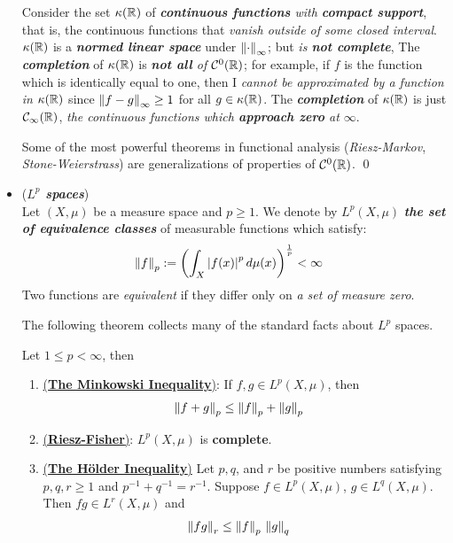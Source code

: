 \documentclass[11pt]{article}
\begin{document}
\begin{itemize}
\begin{example}
Consider the set $\kappa({\mathbb R})$ of \emph{\textbf{continuous functions} with \textbf{compact support}}, that is, the continuous functions that \emph{vanish outside of some closed interval}.  $\kappa({\mathbb R})$  is a \emph{\textbf{normed linear space}} under $\left\|\cdot\right\|_{\infty}$; but \emph{is \textbf{not complete}}, The \emph{\textbf{completion}} of $\kappa({\mathbb R})$ is \emph{\textbf{not all} of ${\mathcal C}^{0}({\mathbb R})$}; for example, if $f$ is the function which is identically equal to one, then I \emph{cannot be approximated by a function in $\kappa({\mathbb R})$} since $\left\|f - g\right\|_{\infty} \ge 1$ for all $g \in \kappa({\mathbb R})$. The \emph{\textbf{completion}} of $\kappa({\mathbb R})$ is just ${\mathcal C}_{\infty}({\mathbb R})$, \emph{the continuous functions which \textbf{approach zero} at $\infty$}. 

Some of the most powerful theorems in functional analysis (\emph{Riesz-Markov}, \emph{Stone-Weierstrass}) are generalizations of properties of ${\mathcal C}^{0}({\mathbb R})$. \qed
\end{example}

\item \begin{example} (\emph{\textbf{$L^{p}$ spaces}})\\
Let $(X, \mu)$ be a measure space and $p\ge 1$. We denote by $L^{p}(X, \mu)$ \emph{\textbf{the set of equivalence classes}} of measurable functions which satisfy:
\begin{align*}
\left\|f\right\|_{p} &:= \left(\int_{X}\left\lvert f(x) \right\rvert^p d\mu(x)\right)^{\frac{1}{p}} < \infty
\end{align*} Two functions are \emph{equivalent} if they differ only on \emph{a set of measure zero}.

The following theorem collects many of the standard facts about $L^{p}$ spaces.
\begin{theorem}
Let $1 \le p < \infty$, then
\begin{enumerate}
\item \underline{(\textbf{The Minkowski Inequality})}: If $f, g \in L^{p}(X, \mu)$, then
\begin{align*}
\left\|f +g\right\|_{p} &\le \left\|f\right\|_{p} + \left\|g\right\|_{p}
\end{align*}
\item  \underline{(\textbf{Riesz-Fisher})}:  $L^{p}(X, \mu)$ is \textbf{complete}.
\item \underline{(\textbf{The H\"older Inequality})} Let $p, q$, and $r$ be positive numbers satisfying
$p, q, r \ge 1$ and $p^{-1} +q^{-1} = r^{-1}$. Suppose  $f \in L^{p}(X, \mu)$, $g \in L^{q}(X, \mu)$. Then
$fg \in L^{r}(X, \mu)$ and
\begin{align*}
\left\|fg\right\|_{r} &\le \left\|f\right\|_{p}\,\left\|g\right\|_{q}
\end{align*}
\end{enumerate}
\end{theorem}


\end{example}
\end{itemize}
\end{document}
